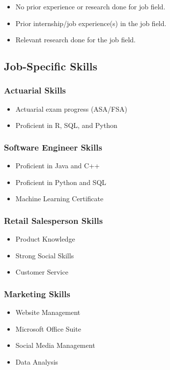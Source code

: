 \documentclass[11pt,letterpaper]{article}
\begin{document}
\begin{itemize}
    \item No prior experience or research done for job field.
    \item Prior internship/job experience(s) in the job field.
    \item Relevant research done for the job field.
\end{itemize}

\subsection{Job-Specific Skills}

\subsubsection{Actuarial Skills}
\begin{itemize}
    \item Actuarial exam progress (ASA/FSA)
    \item Proficient in R, SQL, and Python
\end{itemize}

\subsubsection{Software Engineer Skills}
\begin{itemize}
    \item Proficient in Java and C++
    \item Proficient in Python and SQL
    \item Machine Learning Certificate
\end{itemize}

\subsubsection{Retail Salesperson Skills}
\begin{itemize}
    \item Product Knowledge
    \item Strong Social Skills
    \item Customer Service
\end{itemize}

\subsubsection{Marketing Skills}
\begin{itemize}
    \item Website Management
    \item Microsoft Office Suite
    \item Social Media Management
    \item Data Analysis
\end{itemize}
\end{document}

